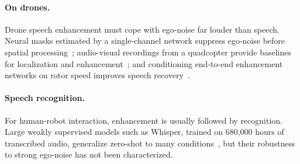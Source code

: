 \paragraph{On drones.}
Drone speech enhancement must cope with ego-noise far louder than speech.
Neural masks estimated by a single-channel network suppress ego-noise before spatial processing~\cite{wang2022drone}; audio-visual recordings from a quadcopter provide baselines for localization and enhancement~\cite{wang2019avq}; and conditioning end-to-end enhancement networks on rotor speed improves speech recovery~\cite{gulli2025rotor}.

\paragraph{Speech recognition.}
For human-robot interaction, enhancement is usually followed by recognition.
Large weakly supervised models such as Whisper, trained on 680{,}000 hours of transcribed audio, generalize zero-shot to many conditions~\cite{radford2023whisper}, but their robustness to strong ego-noise has not been characterized.
